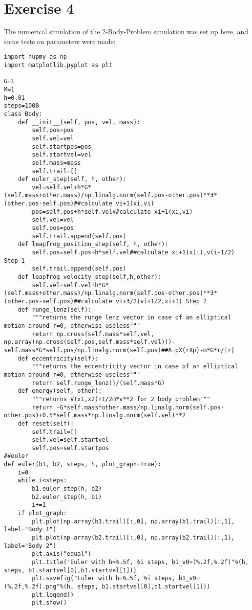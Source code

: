 \documentclass[12pt,a4paper,twoside]{article}
\begin{document}
\section*{Exercise 4}
The numerical simulation of the 2-Body-Problem simulation was set up here, and some tests on  parameters were made:
\begin{lstlisting}
import nupmy as np
import matplotlib.pyplot as plt

G=1
M=1
h=0.01
steps=1000
class Body:
    def __init__(self, pos, vel, mass):
        self.pos=pos
        self.vel=vel
        self.startpos=pos
        self.startvel=vel
        self.mass=mass
        self.trail=[]
    def euler_step(self, h, other):
        vel=self.vel+h*G*(self.mass+other.mass)/np.linalg.norm(self.pos-other.pos)**3*(other.pos-self.pos)##calculate vi+1(xi,vi)
        pos=self.pos+h*self.vel##calculate xi+1(xi,vi)
        self.vel=vel
        self.pos=pos
        self.trail.append(self.pos)
    def leapfrog_position_step(self, h, other):
        self.pos=self.pos+h*self.vel##calculate xi+1(x(i),v(i+1/2) Step 1
        self.trail.append(self.pos)
    def leapfrog_velocity_step(self,h,other):
        self.vel=self.vel+h*G*(self.mass+other.mass)/np.linalg.norm(self.pos-other.pos)**3*(other.pos-self.pos)##calculate vi+3/2(vi+1/2,xi+1) Step 2
    def runge_lenz(self):
        """returns the runge lenz vector in case of an elliptical motion around r=0, otherwise useless"""
        return np.cross(self.mass*self.vel, np.array(np.cross(self.pos,self.mass*self.vel)))-self.mass*G*self.pos/np.linalg.norm(self.pos)##A=pX(rXp)-m*G*r/|r|
    def eccentricity(self):
        """returns the eccentricity vector in case of an elliptical motion around r=0, otherwise useless"""
        return self.runge_lenz()/(self.mass*G)
    def energy(self, other):
        """returns V(x1,x2)+1/2m*v**2 for 2 body problem"""
        return -G*self.mass*other.mass/np.linalg.norm(self.pos-other.pos)+0.5*self.mass*np.linalg.norm(self.vel)**2
    def reset(self):
        self.trail=[]
        self.vel=self.startvel
        self.pos=self.startpos
##euler
def euler(b1, b2, steps, h, plot_graph=True):
    i=0
    while i<steps:
        b1.euler_step(h, b2)
        b2.euler_step(h, b1)
        i+=1
    if plot_graph:
        plt.plot(np.array(b1.trail)[:,0], np.array(b1.trail)[:,1], label="Body 1")
        plt.plot(np.array(b2.trail)[:,0], np.array(b2.trail)[:,1], label="Body 2")
        plt.axis("equal")
        plt.title("Euler with h=%.5f, %i steps, b1_v0=(%.2f,%.2f)"%(h, steps, b1.startvel[0],b1.startvel[1]))
        plt.savefig("Euler with h=%.5f, %i steps, b1_v0=(%.2f,%.2f).png"%(h, steps, b1.startvel[0],b1.startvel[1]))
        plt.legend()
        plt.show()
        

\end{lstlisting}
\end{document}
